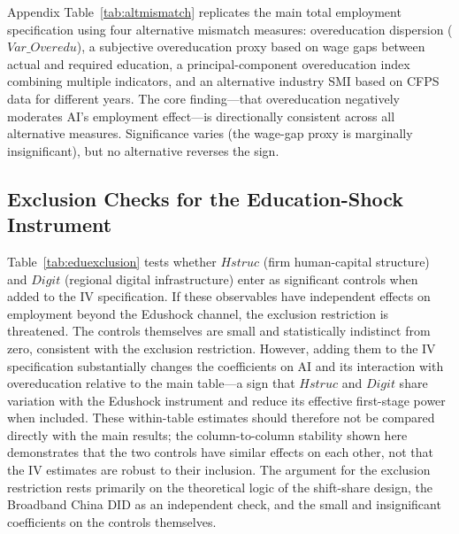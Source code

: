 \documentclass[12pt,a4paper]{article}
\theoremstyle{predstyle}
\theoremstyle{plain}
\newcommand{\Overedu}{\mathit{Overedu}}
\begin{document}
Appendix Table~\ref{tab:altmismatch} replicates the main total employment specification using four alternative mismatch measures: overeducation dispersion (\(Var\_\Overedu\)), a subjective overeducation proxy based on wage gaps between actual and required education, a principal-component overeducation index combining multiple indicators, and an alternative industry SMI based on CFPS data for different years. The core finding---that overeducation negatively moderates AI's employment effect---is directionally consistent across all alternative measures. Significance varies (the wage-gap proxy is marginally insignificant), but no alternative reverses the sign.

\subsection{Exclusion Checks for the Education-Shock Instrument}
\label{sec:excl}

Table~\ref{tab:eduexclusion} tests whether \(Hstruc\) (firm human-capital structure) and \(\mathit{Digit}\) (regional digital infrastructure) enter as significant controls when added to the IV specification. If these observables have independent effects on employment beyond the Edushock channel, the exclusion restriction is threatened. The controls themselves are small and statistically indistinct from zero, consistent with the exclusion restriction. However, adding them to the IV specification substantially changes the coefficients on AI and its interaction with overeducation relative to the main table---a sign that \(Hstruc\) and \(\mathit{Digit}\) share variation with the Edushock instrument and reduce its effective first-stage power when included. These within-table estimates should therefore not be compared directly with the main results; the column-to-column stability shown here demonstrates that the two controls have similar effects on each other, not that the IV estimates are robust to their inclusion. The argument for the exclusion restriction rests primarily on the theoretical logic of the shift-share design, the Broadband China DID as an independent check, and the small and insignificant coefficients on the controls themselves.
\end{document}
